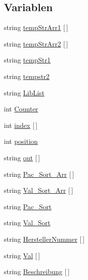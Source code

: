 \subsection*{Variablen}
\begin{DoxyCompactItemize}
\item 
string \hyperlink{_platzhalter_ersetzen_8ulp_ace47333a73f430572c0a88ef37c016ac}{temp\+Str\+Arr1} \mbox{[}$\,$\mbox{]}
\item 
string \hyperlink{_platzhalter_ersetzen_8ulp_ae747ecefe0a8b1f1678fbf27beca17ed}{temp\+Str\+Arr2} \mbox{[}$\,$\mbox{]}
\item 
string \hyperlink{_platzhalter_ersetzen_8ulp_a92031faa8b6be9bafd0fcc7bf1f22bb2}{temp\+Str1}
\item 
string \hyperlink{_platzhalter_ersetzen_8ulp_a9143525c52788805a93de55749a1c99d}{tempstr2}
\item 
string \hyperlink{_platzhalter_ersetzen_8ulp_a991ec8cb88018f637ba0c4aa34c7fdd3}{Lib\+List}
\item 
int \hyperlink{_platzhalter_ersetzen_8ulp_a8da6d6b33b7597f02434fedca1781cbc}{Counter}
\item 
int \hyperlink{_platzhalter_ersetzen_8ulp_ae529cfd688d748de42fa805b2c306253}{index} \mbox{[}$\,$\mbox{]}
\item 
int \hyperlink{_platzhalter_ersetzen_8ulp_a401e942526aac47cef94f478182486e7}{position}
\item 
string \hyperlink{_platzhalter_ersetzen_8ulp_a2d524de6e72f33e2cffb9bed0a05cbc7}{out} \mbox{[}$\,$\mbox{]}
\item 
string \hyperlink{_platzhalter_ersetzen_8ulp_a619ea3d31ff34b29c397408d7a72e2aa}{Pac\+\_\+\+Sort\+\_\+\+Arr} \mbox{[}$\,$\mbox{]}
\item 
string \hyperlink{_platzhalter_ersetzen_8ulp_af793855284d36c1b154929e9737ad5eb}{Val\+\_\+\+Sort\+\_\+\+Arr} \mbox{[}$\,$\mbox{]}
\item 
string \hyperlink{_platzhalter_ersetzen_8ulp_a9658b6387aed3b22f25a8be98530d385}{Pac\+\_\+\+Sort}
\item 
string \hyperlink{_platzhalter_ersetzen_8ulp_a4a476a4ca9399cdb40f332c3f4f194f5}{Val\+\_\+\+Sort}
\item 
string \hyperlink{_platzhalter_ersetzen_8ulp_a6ba91b18d0979e207105d660a2010d8d}{Hersteller\+Nummer} \mbox{[}$\,$\mbox{]}
\item 
string \hyperlink{_platzhalter_ersetzen_8ulp_a088204f20433deace071409889b5aba1}{Val} \mbox{[}$\,$\mbox{]}
\item 
string \hyperlink{_platzhalter_ersetzen_8ulp_a0165df64e95135bade509c58bdb353f1}{Beschreibung} \mbox{[}$\,$\mbox{]}

\end{DoxyCompactItemize}
